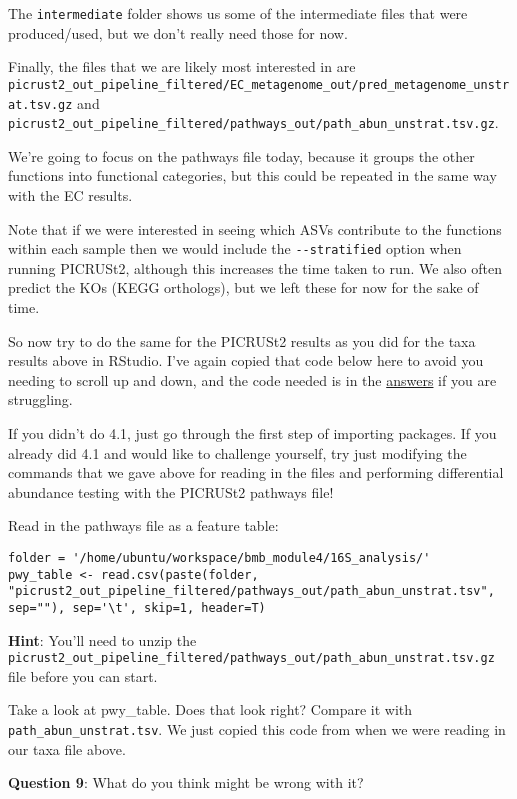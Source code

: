 \documentclass[
]{book}
\begin{document}
The \texttt{intermediate} folder shows us some of the intermediate files that were produced/used, but we don't really need those for now.

Finally, the files that we are likely most interested in are \texttt{picrust2\_out\_pipeline\_filtered/EC\_metagenome\_out/pred\_metagenome\_unstrat.tsv.gz} and \texttt{picrust2\_out\_pipeline\_filtered/pathways\_out/path\_abun\_unstrat.tsv.gz}.

We're going to focus on the pathways file today, because it groups the other functions into functional categories, but this could be repeated in the same way with the EC results.

Note that if we were interested in seeing which ASVs contribute to the functions within each sample then we would include the \texttt{-\/-stratified} option when running PICRUSt2, although this increases the time taken to run. We also often predict the KOs (KEGG orthologs), but we left these for now for the sake of time.

So now try to do the same for the PICRUSt2 results as you did for the taxa results above in RStudio. I've again copied that code below here to avoid you needing to scroll up and down, and the code needed is in the \hyperref[answers]{answers} if you are struggling.

If you didn't do 4.1, just go through the first step of importing packages. If you already did 4.1 and would like to challenge yourself, try just modifying the commands that we gave above for reading in the files and performing differential abundance testing with the PICRUSt2 pathways file!

Read in the pathways file as a feature table:

\begin{verbatim}
folder = '/home/ubuntu/workspace/bmb_module4/16S_analysis/'
pwy_table <- read.csv(paste(folder, "picrust2_out_pipeline_filtered/pathways_out/path_abun_unstrat.tsv", sep=""), sep='\t', skip=1, header=T)
\end{verbatim}

\textbf{Hint}: You'll need to unzip the \texttt{picrust2\_out\_pipeline\_filtered/pathways\_out/path\_abun\_unstrat.tsv.gz} file before you can start.

Take a look at pwy\_table. Does that look right? Compare it with \texttt{path\_abun\_unstrat.tsv}. We just copied this code from when we were reading in our taxa file above.

\textbf{Question 9}: What do you think might be wrong with it?
\end{document}
